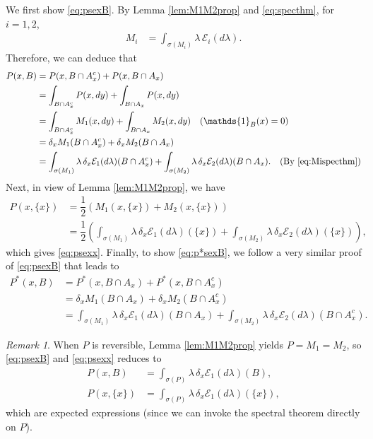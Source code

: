 \documentclass[12pt,a4]{amsart}
\numberwithin{equation}{section}
\theoremstyle{plain}
\theoremstyle{definition}
\theoremstyle{remark}
\newtheorem{rk}{Remark}[section]
\let\oldendproof\endproof
\renewenvironment{proof}[1][\proofname]{%
  \oldproof[\noindent\textbf{#1.} ]%
}{\oldendproof}
\newcommand{\1}{\mathds{1}}
\begin{document}
\begin{proof}
We first show \eqref{eq:psexB}. By Lemma \ref{lem:M1M2prop} and \eqref{eq:specthm}, for $i=1,2$,
\begin{align}\label{eq:Mispecthm}
	M_i &= \int_{\sigma(M_i)} \lambda \, \mathcal{E}_i(d \lambda).
\end{align}
Therefore, we can deduce that
\begin{align*}
	P(x,B) &= P(x,B \cap A_x^c) + P(x,B \cap A_x) \\
		   &= \int_{B \cap A_x^c} P(x,dy) + \int_{B \cap A_x} P(x,dy) \\
		   &= \int_{B \cap A_x^c} M_1(x,dy) + \int_{B \cap A_x} M_2(x,dy) \quad (\1_B(x) = 0) \\
		   &= \delta_x M_1(B \cap A_x^c) + \delta_x M_2(B \cap A_x) \\
		   &= \int_{\sigma(M_1)} \lambda \, \delta_x \mathcal{E}_1(d \lambda) (B \cap A_x^c) +  \int_{\sigma(M_2)} \lambda \, \delta_x \mathcal{E}_2(d \lambda) (B \cap A_x) . \quad \text{(By \eqref{eq:Mispecthm})}
\end{align*}
Next, in view of Lemma \ref{lem:M1M2prop}, we have
\begin{align*}
	P(x,\{x\}) &= \dfrac{1}{2} \left(M_1(x,\{x\}) + M_2(x,\{x\}) \right)\\
	&= \dfrac{1}{2} \left( \int_{\sigma(M_1)} \lambda \, \delta_x \mathcal{E}_1(d \lambda) (\{x\} ) + \int_{\sigma(M_2)} \lambda \, \delta_x \mathcal{E}_2(d \lambda) (\{x\}) \right),
\end{align*}
which gives \eqref{eq:psexx}. Finally, to show \eqref{eq:p*sexB}, we follow a very similar proof of \eqref{eq:psexB} that leads to
\begin{align*}
	P^*(x,B) &= P^*(x,B \cap A_x) + P^*(x,B \cap A_x^c) \\
	&= \delta_x M_1(B \cap A_x) + \delta_x M_2(B \cap A_x^c) \\
	&= \int_{\sigma(M_1)} \lambda \, \delta_x \mathcal{E}_1(d \lambda) (B \cap A_x) + \int_{\sigma(M_2)} \lambda \, \delta_x \mathcal{E}_2(d \lambda) (B \cap A_x^c) .
\end{align*}
\end{proof}

\begin{rk}%
When $P$ is reversible, Lemma \ref{lem:M1M2prop} yields $P = M_1 = M_2$, so \eqref{eq:psexB} and \eqref{eq:psexx} reduces to
		\begin{align*}
		P(x,B) &= \int_{\sigma(P)} \lambda \, \delta_x \mathcal{E}_1(d \lambda) (B), \\
		P(x,\{x\}) &= \int_{\sigma(P)} \lambda \, \delta_x \mathcal{E}_1(d \lambda) (\{x\}) ,
		\end{align*}
		which are expected expressions (since we can invoke the spectral theorem directly on $P$).
\end{rk}
\end{document}
